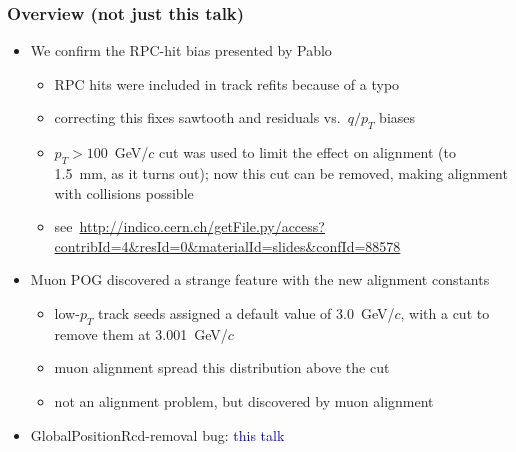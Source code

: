 \documentclass[compress]{beamer}
\begin{document}

\begin{frame}
\frametitle{Overview (not just this talk)}
\begin{itemize}
\item We confirm the RPC-hit bias presented by Pablo
\begin{itemize}
\item RPC hits were included in track refits because of a typo
\item correcting this fixes sawtooth and residuals vs.\ $q/p_T$ biases
\item $p_T > 100$~GeV/$c$ cut was used to limit the effect on alignment (to 1.5~mm, as it turns out); now this cut can be removed, making alignment with collisions possible
\item \mbox{see \href{http://indico.cern.ch/getFile.py/access?contribId=4&resId=0&materialId=slides&confId=88578}{\tiny http://indico.cern.ch/getFile.py/access?contribId=4\&resId=0\&materialId=slides\&confId=88578}\hspace{-1 cm}}
\end{itemize}
\item Muon POG discovered a strange feature with the new alignment constants
\begin{itemize}
\item low-$p_T$ track seeds assigned a default value of 3.0~GeV/$c$, with a cut to remove them at 3.001~GeV/$c$
\item muon alignment spread this distribution above the cut
\item not an alignment problem, but discovered by muon alignment
\end{itemize}
\item GlobalPositionRcd-removal bug: \textcolor{darkblue}{this talk}
\end{itemize}
\end{frame}
\end{document}
